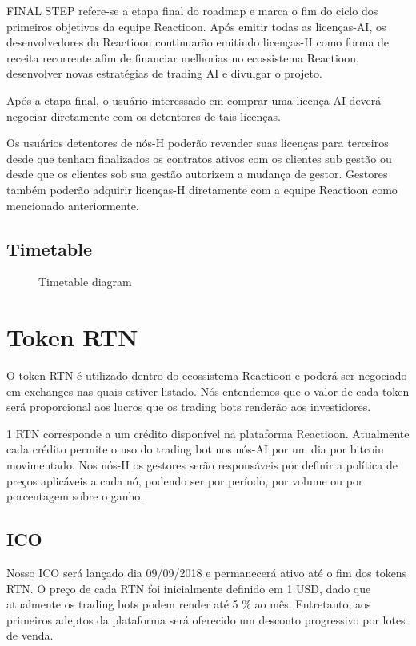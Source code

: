 \documentclass[
	article,			%
	12pt,				%
	oneside,			%
	a4paper,			%
	brazil,				%
	english,
	sumario=tradicional
	]{abntex2}
\begin{document}
FINAL STEP refere-se a etapa final do roadmap e marca o fim do ciclo dos primeiros objetivos da equipe Reactioon.  Após emitir todas as licenças-AI, os desenvolvedores da Reactioon continuarão emitindo licenças-H como forma de receita recorrente afim de financiar melhorias no ecossistema Reactioon, desenvolver novas estratégias de trading AI e divulgar o projeto.

Após a etapa final, o usuário interessado em comprar uma licença-AI deverá negociar diretamente com os detentores de tais licenças. 

Os usuários detentores de nós-H poderão revender suas licenças para terceiros desde que tenham finalizados os contratos ativos com os clientes sub gestão ou desde que os clientes sob sua gestão autorizem a mudança de gestor. Gestores também poderão adquirir licenças-H diretamente com a equipe Reactioon como mencionado anteriormente.

\subsection{Timetable}
\begin{figure}[H]
    \centering
    \makebox[\textwidth]{}
\caption{Timetable diagram}
\end{figure}
\section{Token RTN}
O token RTN é utilizado dentro do ecossistema Reactioon e poderá ser negociado em exchanges nas quais estiver listado. Nós entendemos que o valor de cada token será proporcional aos lucros que os trading bots renderão aos investidores.

1 RTN corresponde a um crédito disponível na plataforma Reactioon. Atualmente cada crédito permite o uso do trading bot nos nós-AI por um dia por bitcoin movimentado. Nos nós-H os gestores serão responsáveis por definir a política de preços aplicáveis a cada nó, podendo ser por período, por volume ou por porcentagem sobre o ganho.

\subsection{ICO}
Nosso ICO será lançado dia 09/09/2018 e permanecerá ativo até o fim dos tokens RTN. O preço de cada RTN foi inicialmente definido em 1 USD, dado que atualmente os trading bots podem render até 5 \% ao mês. Entretanto, aos primeiros adeptos da plataforma será oferecido um desconto progressivo por lotes de venda.
\end{document}
